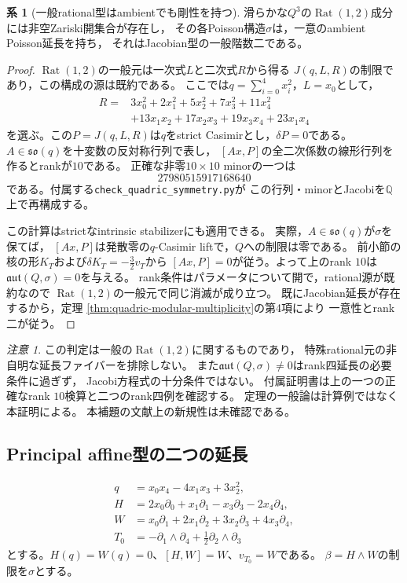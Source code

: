 \documentclass[a4paper,11pt]{ltjsarticle}
\theoremstyle{definition}
\newtheorem{corollary}[theorem]{系}
\theoremstyle{definition}\newtheorem{definition}[theorem]{定義}
\theoremstyle{remark}\newtheorem{remark}[theorem]{注意}
\newcommand{\Rat}{\operatorname{Rat}}\newcommand{\Gr}{\operatorname{Gr}}
\begin{document}
\begin{corollary}[一般rational型はambientでも剛性を持つ]
\label{cor:quadric-generic-rational-rigidity}
滑らかな$Q^3$の$\Rat(1,2)$成分には非空Zariski開集合が存在し，
その各Poisson構造$\sigma$は，一意のambient Poisson延長を持ち，
それはJacobian型の一般階数二である。
\end{corollary}
\begin{proof}
$\Rat(1,2)$の一般元は一次式$L$と二次式$R$から得る
$J(q,L,R)$の制限であり，この構成の源は既約である\cite{LPT}。
ここでは$q=\sum_{i=0}^4x_i^2$，$L=x_0$として，
\[
\begin{split}
R={}&3x_0^2+2x_1^2+5x_2^2+7x_3^2+11x_4^2\\
 &+13x_1x_2+17x_2x_3+19x_3x_4+23x_1x_4
\end{split}
\]
を選ぶ。この$P=J(q,L,R)$は$q$をstrict Casimirとし，$\delta P=0$である。
$A\in\mathfrak{so}(q)$を十変数の反対称行列で表し，
$[Ax,P]$の全二次係数の線形行列を作るとrankが$10$である。
正確な非零$10\times10$ minorの一つは
\[
 27980515917168640
\]
である。付属する\texttt{check\_quadric\_symmetry.py}が
この行列・minorとJacobiを$\mathbb Q$上で再構成する。

この計算はstrictなintrinsic stabilizerにも適用できる。
実際，$A\in\mathfrak{so}(q)$が$\sigma$を保てば，
$[Ax,P]$は発散零の$q$-Casimir liftで，$Q$への制限は零である。
前小節の核の形$K_T$および$\delta K_T=-\frac32v_T$から
$[Ax,P]=0$が従う。よって上のrank $10$は
$\mathfrak{aut}(Q,\sigma)=0$を与える。
rank条件はパラメータについて開で，rational源が既約なので
$\Rat(1,2)$の一般元で同じ消滅が成り立つ。
既にJacobian延長が存在するから，定理
\ref{thm:quadric-modular-multiplicity}の第4項により
一意性とrank二が従う。
\end{proof}

\begin{remark}
この判定は一般の$\Rat(1,2)$に関するものであり，
特殊rational元の非自明な延長ファイバーを排除しない。
また$\mathfrak{aut}(Q,\sigma)\ne0$はrank四延長の必要条件に過ぎず，
Jacobi方程式の十分条件ではない。
付属証明書は上の一つの正確なrank $10$検算と二つのrank四例を確認する。
定理の一般論は計算例ではなく本証明による。
本補題の文献上の新規性は未確認である。
\end{remark}

\subsection{Principal affine型の二つの延長}
\[
\begin{split}
q&=x_0x_4-4x_1x_3+3x_2^2,\\
H&=2x_0\partial_0+x_1\partial_1-x_3\partial_3-2x_4\partial_4,\\
W&=x_0\partial_1+2x_1\partial_2+3x_2\partial_3+4x_3\partial_4,\\
T_0&=-\partial_1\wedge\partial_4+\tfrac12\partial_2\wedge\partial_3
\end{split}
\]
とする。$H(q)=W(q)=0$、$[H,W]=W$、$v_{T_0}=W$である。
$\beta=H\wedge W$の制限を$\sigma$とする。
\end{document}
